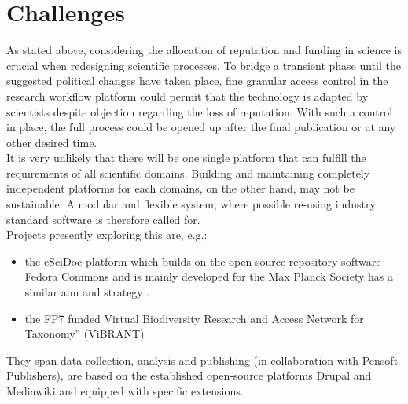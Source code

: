 \documentclass{article}
\begin{document}
\section{Challenges}

As stated above, considering the allocation of reputation and funding
in science is crucial when redesigning scientific processes. To bridge
a transient phase until the suggested political changes have taken
place, fine granular access control in the research workflow platform
could permit that the technology is adapted by scientists despite
objection regarding the loss of reputation. With such a control in
place, the full process could be opened up after the final publication
or at any other desired time.\\

It is very unlikely that there will be one single platform that can
fulfill the requirements of all scientific domains. Building and
maintaining completely independent platforms for each domains, on the
other hand, may not be sustainable. A modular and flexible system,
where possible re-using industry standard software is therefore called
for.\\

Projects presently exploring this are, e.g.:

\begin{itemize}
\item the eSciDoc platform which builds on the open-source repository
  software Fedora Commons \cite{Feudora} and is mainly developed for
  the Max Planck Society has a similar aim and strategy \cite{Dreyer}.
\item the FP7 funded Virtual Biodiversity Research and Access Network
  for Taxonomy'' (ViBRANT) \cite{ViBRANT, Roberts, Blagoderov}
\end{itemize}

They span data collection, analysis and publishing (in collaboration
with Pensoft Publishers), are based on the established open-source
platforms Drupal \cite{Drupal} and Mediawiki \cite{Mediawiki} and
equipped with specific extensions.
\end{document}
